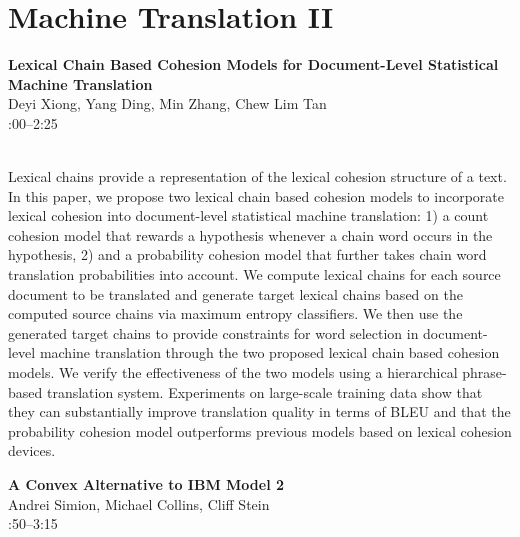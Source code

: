\documentclass[twoside,makeidx]{book}
\renewcommand{\normalsize}{\fontsize{8}{9}\selectfont}
\renewcommand{\small}{\fontsize{7}{8}\selectfont}
\begin{document}
\section{Machine Translation II}
\vspace{-1em}
\par\vspace{2em}\noindent%
\begin{minipage}{\linewidth}%
\begin{center}
\textbf{\normalsize Lexical Chain Based Cohesion Models for Document-Level Statistical Machine Translation}\\
\normalsize  Deyi Xiong,  Yang Ding,  Min Zhang,  Chew Lim Tan\\
{\small 2:00--2:25}\\
\end{center}
\end{minipage}\\[0.5em]
\nopagebreak%
\noindent%
{\small Lexical chains provide a representation of the lexical cohesion structure of a text. In this paper, we propose two lexical chain based cohesion models to incorporate lexical cohesion into document-level statistical machine translation: 1) a count cohesion model that rewards a hypothesis whenever a chain word occurs in the hypothesis, 2) and a probability cohesion model that further takes chain word translation probabilities into account. We compute lexical chains for each source document to be translated and generate target lexical chains based on the computed source chains via maximum entropy classifiers. We then use the generated target chains to provide constraints for word selection in document-level machine translation through the two proposed lexical chain based cohesion models. We verify the effectiveness of the two models using a hierarchical phrase-based translation system. Experiments on large-scale training data show that they can substantially improve translation quality in terms of BLEU and that the probability cohesion model outperforms previous models based on lexical cohesion devices.}
\par\vspace{2em}\noindent%
\begin{minipage}{\linewidth}%
\begin{center}
\textbf{\normalsize A Convex Alternative to IBM Model 2}\\
\normalsize  Andrei Simion,  Michael Collins,  Cliff Stein\\
{\small 2:50--3:15}\\
\end{center}
\end{minipage}\\[0.5em]
\end{document}
